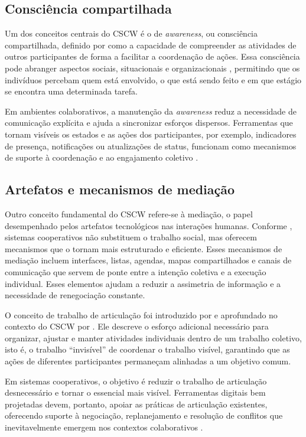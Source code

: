         \subsection{Consciência compartilhada}
        Um dos conceitos centrais do CSCW é o de \textit{awareness}, ou consciência compartilhada, definido por  como a capacidade de compreender as atividades de outros participantes de forma a facilitar a coordenação de ações. Essa consciência pode abranger aspectos sociais, situacionais e organizacionais \cite{GutwinGreenberg2002}, permitindo que os indivíduos percebam quem está envolvido, o que está sendo feito e em que estágio se encontra uma determinada tarefa.

        Em ambientes colaborativos, a manutenção da \textit{awareness} reduz a necessidade de comunicação explícita e ajuda a sincronizar esforços dispersos. Ferramentas que tornam visíveis os estados e as ações dos participantes, por exemplo, indicadores de presença, notificações ou atualizações de status, funcionam como mecanismos de suporte à coordenação e ao engajamento coletivo \cite{olson2000distance}.

        \subsection{Artefatos e mecanismos de mediação}
        Outro conceito fundamental do CSCW refere-se à mediação, o papel desempenhado pelos artefatos tecnológicos nas interações humanas. Conforme , sistemas cooperativos não substituem o trabalho social, mas oferecem mecanismos que o tornam mais estruturado e eficiente. Esses mecanismos de mediação incluem interfaces, listas, agendas, mapas compartilhados e canais de comunicação que servem de ponte entre a intenção coletiva e a execução individual. Esses elementos ajudam a reduzir a assimetria de informação e a necessidade de renegociação constante.

        O conceito de trabalho de articulação foi introduzido por  e aprofundado no contexto do CSCW por . Ele descreve o esforço adicional necessário para organizar, ajustar e manter atividades individuais dentro de um trabalho coletivo, isto é, o trabalho “invisível” de coordenar o trabalho visível, garantindo que as ações de diferentes participantes permaneçam alinhadas a um objetivo comum.

        Em sistemas cooperativos, o objetivo é reduzir o trabalho de articulação desnecessário e tornar o essencial mais visível. Ferramentas digitais bem projetadas devem, portanto, apoiar as práticas de articulação existentes, oferecendo suporte à negociação, replanejamento e resolução de conflitos que inevitavelmente emergem nos contextos colaborativos \cite{Schmidt2011}. 

